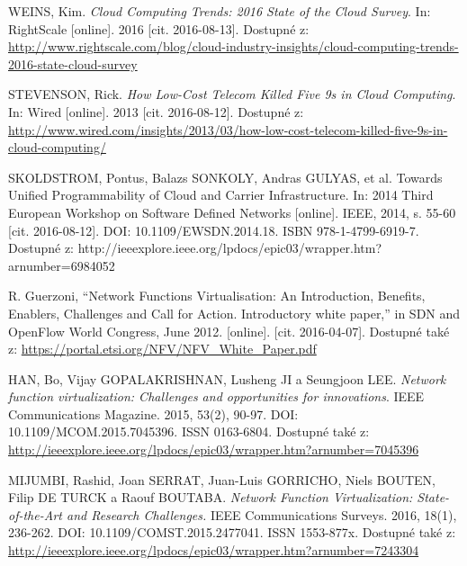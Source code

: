 
\renewcommand{\appendixname}{Literatura}%

  
\begin{thebibliography}{10}

WEINS, Kim. \emph{Cloud Computing Trends: 2016 State of the Cloud Survey}. In: RightScale [online]. 2016 [cit. 2016-08-13]. Dostupné z: \url{http://www.rightscale.com/blog/cloud-industry-insights/cloud-computing-trends-2016-state-cloud-survey}

STEVENSON, Rick. \emph{How Low-Cost Telecom Killed Five 9s in Cloud Computing}. In: Wired [online]. 2013 [cit. 2016-08-12]. Dostupné z: \url{http://www.wired.com/insights/2013/03/how-low-cost-telecom-killed-five-9s-in-cloud-computing/}

SKOLDSTROM, Pontus, Balazs SONKOLY, Andras GULYAS, et al. Towards Unified Programmability of Cloud and Carrier Infrastructure. In: 2014 Third European Workshop on Software Defined Networks [online]. IEEE, 2014, s. 55-60 [cit. 2016-08-12]. DOI: 10.1109/EWSDN.2014.18. ISBN 978-1-4799-6919-7. Dostupné z: http://ieeexplore.ieee.org/lpdocs/epic03/wrapper.htm?arnumber=6984052

R. Guerzoni, “Network Functions Virtualisation: An Introduction, Benefits, Enablers, Challenges and Call for Action. Introductory white paper,” in SDN and OpenFlow World Congress, June 2012. [online]. [cit. 2016-04-07]. Dostupné také z: \url{https://portal.etsi.org/NFV/NFV_White_Paper.pdf}

HAN, Bo, Vijay GOPALAKRISHNAN, Lusheng JI a Seungjoon LEE. \emph{Network function virtualization: Challenges and opportunities for innovations}. IEEE Communications Magazine. 2015, 53(2), 90-97. DOI: 10.1109/MCOM.2015.7045396. ISSN 0163-6804. Dostupné také z: \url{http://ieeexplore.ieee.org/lpdocs/epic03/wrapper.htm?arnumber=7045396}

MIJUMBI, Rashid, Joan SERRAT, Juan-Luis GORRICHO, Niels BOUTEN, Filip DE TURCK a Raouf BOUTABA. \emph{Network Function Virtualization: State-of-the-Art and Research Challenges.} IEEE Communications Surveys. 2016, 18(1), 236-262. DOI: 10.1109/COMST.2015.2477041. ISSN 1553-877x. Dostupné také z: \url{http://ieeexplore.ieee.org/lpdocs/epic03/wrapper.htm?arnumber=7243304}


\end{thebibliography}
